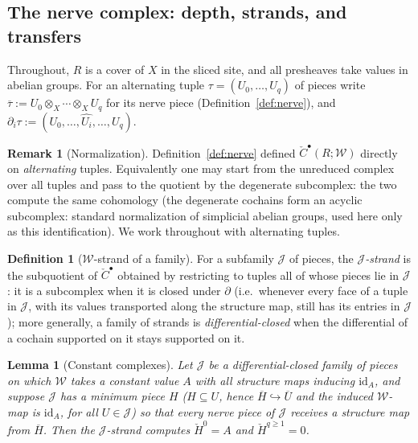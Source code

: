 \documentclass[11pt]{article}
\newtheorem{lemma}[theorem]{Lemma}
\theoremstyle{definition}
\newtheorem{definition}[theorem]{Definition}
\newtheorem{remark}[theorem]{Remark}
\newcommand{\HH}{\check{H}}
\newcommand{\cC}{\check{C}}
\begin{document}
\subsection{The nerve complex: depth, strands, and transfers}
\label{ssec:nervetricks}

Throughout, $R$ is a cover of $X$ in the sliced site, and all
presheaves take values in abelian groups. For an alternating tuple
$\tau=(U_0,\dots,U_q)$ of pieces write
$\overline\tau:=U_0\otimes_X\cdots\otimes_X U_q$ for its nerve
piece (Definition~\ref{def:nerve}), and
$\partial_i\tau:=(U_0,\dots,\widehat{U_i},\dots,U_q)$.

\begin{remark}[Normalization]\label{rem:normalize}
Definition~\ref{def:nerve} defined $\cC^\bullet(R;\mathscr W)$
directly on \emph{alternating} tuples. Equivalently one may start
from the unreduced complex over all tuples and pass to the quotient
by the degenerate subcomplex: the two compute the same cohomology
(the degenerate cochains form an acyclic subcomplex: standard
normalization of simplicial abelian groups, used here only as this
identification). We work throughout with alternating tuples.
\end{remark}

\begin{definition}[$\mathscr W$-strand of a family]\label{def:strand}
For a subfamily $\mathcal J$ of pieces, the \emph{$\mathcal
J$-strand} is the subquotient of $\cC^\bullet$ obtained by
restricting to tuples all of whose pieces lie in $\mathcal J$: it is
a subcomplex when it is closed under $\partial$ (i.e.\ whenever
every face of a tuple in $\mathcal J$, with its values transported
along the structure map, still has its entries in $\mathcal J$);
more generally, a family of strands is \emph{differential-closed}
when the differential of a cochain supported on it stays supported
on it.
\end{definition}

\begin{lemma}[Constant complexes]\label{lem:constcx}
Let $\mathcal J$ be a differential-closed family of pieces on
which $\mathscr W$ takes a constant value $A$ with all structure
maps inducing $\mathrm{id}_A$, and suppose $\mathcal J$ has a
minimum piece $H$ \textup{(}$H\subseteq U$, hence
$\overline H\hookrightarrow\overline U$ and the induced
$\mathscr W$-map is $\mathrm{id}_A$, for all
$U\in\mathcal J$\textup{)} so that every nerve piece of
$\mathcal J$ receives a structure map from $\overline H$.
Then the $\mathcal J$-strand computes $\HH^0=A$ and
$\HH^{q\ge1}=0$.
\end{lemma}
\end{document}

